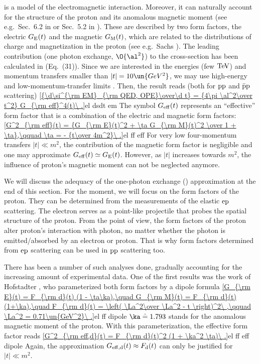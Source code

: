  is a  model of the electromagnetic interaction. Moreover, it can naturally account for the structure of the proton and its anomalous magnetic moment (see e.g.~Sec.~6.2 in  or Sec.~5.2 in ). These are described by two form factors, the electric $G_{\rm E}(t)$ and the magnetic $G_{\rm M}(t)$, which are related to the distributions of charge and magnetization in the proton (see e.g.~Sachs ). The leading contribution (one photon exchange, $\O{\al^2}$) to the cross-section has been calculated in  (Eq.~(31)). Since we are interested in the  energies (few $\rm TeV$) and momentum transfers smaller than $|t| = 10\un{GeV^2}$, we may use high-energy and low-momentum-transfer limits . Then, the result reads (both for $\rm pp$ and $\rm \bar p p$ scattering)
\eqref{{\d\si^{\rm EM}_{\rm QED, OPE}\over\d t} = {4\pi \al^2\over t^2} G_{\rm eff}^4(t)\ .}{el dsdt em}
The symbol $G_{\rm eff}(t)$ represents an ``effective'' form factor that is a combination of the electric and magnetic form factors:
\eqref{G^2_{\rm eff}(t) = {G_{\rm E}(t)^2 + \ta G_{\rm M}(t)^2 \over 1 + \ta},\qquad \ta = - {t\over 4m^2}\ .}{el ff eff}
For very low four-momentum transfers $|t| \ll m^2$, the contribution of the magnetic form factor is negligible and one may approximate $G_{\rm eff}(t) \simeq G_{\rm E}(t)$. However, as $|t|$ increases towards $m^2$, the influence of proton's magnetic moment can not be neglected anymore.

We will discuss the adequacy of the one-photon exchange () approximation at the end of this section. For the moment, we will focus on the form factors of the proton. They can be determined from the measurements of the elastic $\rm ep$ scattering. The electron serves as a point-like projectile that probes the spatial structure of the proton. From the  point of view, the form factors of the proton alter proton's interaction with photon, no matter whether the photon is emitted/absorbed by an electron or proton. That is why form factors determined from $\rm ep$ scattering can be used in $\rm pp$ scattering too.

There has been a number of such analyses done, gradually accounting for the increasing amount of experimental data. One of the first results was the work of Hofstadter , who parameterized both form factors by a dipole formula
\eqref{G_{\rm E}(t) = F_{\rm d}(t) (1 - \ta\ka),\quad G_{\rm M}(t) = F_{\rm d}(t) (1+\ka),\quad F_{\rm d}(t) = \left( \La^2\over \La^2 - t \right)^2\ ,\qquad \La^2 = 0.71\un{GeV^2}\ .}{el ff dipole}
$\ka\doteq 1.793$ stands for the anomalous magnetic moment of the proton. With this parameterization, the effective form factor reads
\eqref{G^2_{\rm eff,d}(t) = F_{\rm d}(t)^2 (1 + \ka^2 \ta)\ .}{el ff eff dipole}
Again, the approximation $G_{\rm eff,d}(t)\approx F_{\rm d}(t)$ can only be justified for $|t| \ll m^2$.

